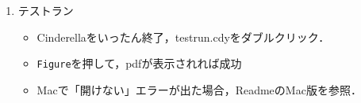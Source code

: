 \documentclass{ujarticle}
\begin{document}
\begin{enumerate}[\bf\large 1.]
\vspace{76mm}

\item テストラン\vspace{-2mm}

\begin{itemize}
 \item Cinderellaをいったん終了，testrun.cdyをダブルクリック．
\item\verb|Figure|を押して，pdfが表示されれば成功
\item Macで「開けない」エラーが出た場合，ReadmeのMac版を参照．
\end{itemize}

\end{enumerate}
\end{document}
